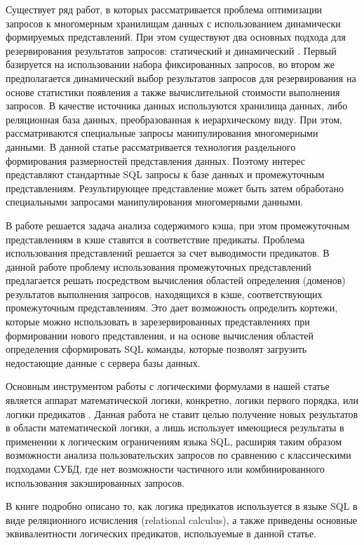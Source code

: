 \documentclass{cmi}
\begin{document}
Существует ряд работ, в которых рассматривается проблема оптимизации запросов к многомерным хранилищам данных с использованием динамически формируемых представлений. При этом существуют два основных подхода для резервирования результатов запросов: статический \cite{baralis, gupta97, gupta99} и динамический \cite{scheuermann, shim, kalnis, chang}. Первый базируется на использовании набора фиксированных запросов, во втором же предполагается динамический выбор результатов запросов  для резервирования на основе статистики появления а также вычислительной стоимости выполнения запросов. В качестве источника данных используются хранилища данных, либо реляционная база данных, преобразованная к иерархическому виду. При этом, рассматриваются специальные запросы манипулирования многомерными данными. В данной статье рассматривается технология раздельного формирования размерностей представления данных. Поэтому интерес представляют стандартные SQL запросы к базе данных и промежуточным представлениям.  Результирующее представление может быть затем обработано специальными запросами манипулирования многомерными данными.

В работе \cite{keller} решается задача анализа содержимого кэша, при этом промежуточным представлениям в кэше ставятся в соответствие предикаты. Проблема использования представлений решается за счет выводимости предикатов. В данной работе проблему использования промежуточных представлений предлагается решать посредством вычисления областей определения (доменов) результатов выполнения запросов, находящихся в кэше, соответствующих промежуточным представлениям. Это дает возможность определить кортежи, которые можно использовать в зарезервированных представлениях при формировании нового представления, и на основе вычисления областей определения сформировать SQL команды, которые позволят загрузить недостающие данные с сервера базы данных.

Основным инструментом работы с логическими формулами в нашей статье является аппарат математической логики, конкретно, логики первого порядка, или логики предикатов \cite{hilbert, mendelson, church}. Данная работа не ставит
целью получение новых результатов в области математической логики, а лишь использует имеющиеся результаты в
применении к логическим ограничениям языка SQL, расширяя таким образом возможности анализа пользовательских
запросов по сравнению с классическими подходами СУБД, где нет возможности частичного или комбинированного
использования закэшированных запросов.

В книге \cite{date} подробно описано то, как логика предикатов используется в языке SQL в виде
реляционного исчисления (relational calculus), а также приведены основные эквивалентности логических
предикатов, используемые в данной статье.
\end{document}
